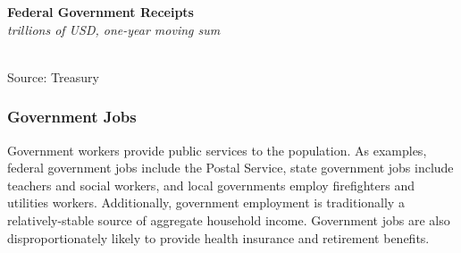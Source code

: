 \documentclass{report}
\makeatletter
\newcommand{\tbllink}[1]{\href{https://raw.githubusercontent.com/bdecon/US-chartbook/master/chartbook/data/#1}{\faTable}}
\newcommand*\short[1]{\expandafter\@gobbletwo\number\numexpr#1\relax}
\newcommand{\stdnode}[3]{\node[below, align=left, shift=({#1,#2})]{#3};}
\newcommand{\ltdateaxisticks}{
		date coordinates in=x, axis line style={draw=none},
		xmax={2022-03-15},
		max space between ticks=40,	    
		xtick={{2013-01-01}, {2014-01-01}, {2015-01-01}, {2016-01-01}, {2017-01-01}, {2018-01-01}, 
		    {2019-01-01}, {2020-01-01}, {2021-01-01}, {2022-01-01}},
		enlarge y limits={0.06}, enlarge x limits={0.01},
		}
\newcommand{\bbar}[2]{extra #1 ticks = {{#2}}, extra #1 tick labels = ,
		extra #1 tick style = {grid=major, grid style={thick, black!25}},}
\newcommand{\stdline}[4]{\addplot[very thick, no markers, color=#1] 
		table [x=#2, y=#3, col sep=comma] {#4};	}
\newcommand{\rbar}{
		\fill[color=black!10] (axis cs:{2020-02-01},\pgfkeysvalueof{/pgfplots/ymin}) rectangle 
			(axis cs:{2020-05-01}, \pgfkeysvalueof{/pgfplots/ymax});}
\makeatother
\begin{document}
{\begin{minipage}{0.76\textwidth}
\small 
\end{minipage}  
\vspace{1mm}

\begin{minipage}{0.36\textwidth}
\normalsize \textbf{Federal Government Receipts}\\
\footnotesize{\textit{trillions of USD, one-year moving sum}}\\
\hspace*{-2mm} \\
\footnotesize{Source: Treasury} \hfill \tbllink{tmb_rec.csv}
\end{minipage}
\newpage
\begin{minipage}{0.76\textwidth}
\subsubsection*{Government Jobs}
\small Government workers provide public services to the population. As examples, federal government jobs include the Postal Service, state government jobs include teachers and social workers, and local governments employ firefighters and utilities workers. Additionally, government employment is traditionally a relatively-stable source of aggregate household income. Government jobs are also disproportionately likely to provide health insurance and retirement benefits.  
\end{minipage}
\vspace{1mm}

}
\end{document}
